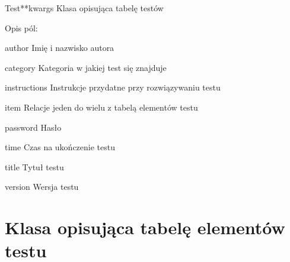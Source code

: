 \documentclass[letterpaper,10pt,polish]{manual}
\begin{document}
\hypertarget{dbmodel.Test}{}\begin{classdesc}{Test}{**kwargs}
Klasa opisująca tabelę testów

Opis pól:

\hypertarget{dbmodel.Test.author}{}\begin{memberdesc}{author}
Imię i nazwisko autora
\end{memberdesc}

\hypertarget{dbmodel.Test.category}{}\begin{memberdesc}{category}
Kategoria w jakiej test się znajduje
\end{memberdesc}

\hypertarget{dbmodel.Test.instructions}{}\begin{memberdesc}{instructions}
Instrukcje przydatne przy rozwiązywaniu testu
\end{memberdesc}

\hypertarget{dbmodel.Test.item}{}\begin{memberdesc}{item}
Relacje jeden do wielu z tabelą elementów testu
\end{memberdesc}

\hypertarget{dbmodel.Test.password}{}\begin{memberdesc}{password}
Hasło
\end{memberdesc}

\hypertarget{dbmodel.Test.time}{}\begin{memberdesc}{time}
Czas na ukończenie testu
\end{memberdesc}

\hypertarget{dbmodel.Test.title}{}\begin{memberdesc}{title}
Tytuł testu
\end{memberdesc}

\hypertarget{dbmodel.Test.version}{}\begin{memberdesc}{version}
Wersja testu
\end{memberdesc}
\end{classdesc}
\hypertarget{dbmodel-item}{}

\section{Klasa opisująca tabelę elementów testu}
\end{document}
